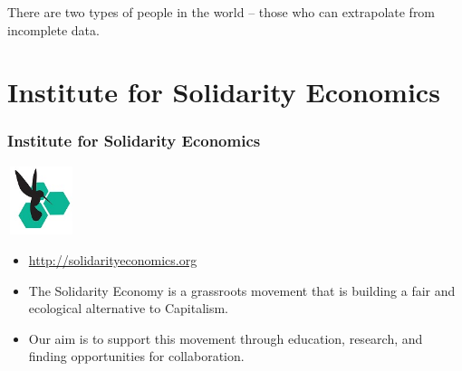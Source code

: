 \geek There are two types of people in the world -- those who can extrapolate from incomplete data.



\frame{\titlepage}

\frame{\tableofcontents}

\section{Institute for Solidarity Economics}
\frame
{
  \frametitle{Institute for Solidarity Economics}
  \begin{center}
    \includegraphics[height=2cm,width=2cm]{ise-logo.jpg}
  \end{center}
  \begin{itemize}
    \item<1-> \url{http://solidarityeconomics.org}
    \item<1-> The Solidarity Economy is a grassroots movement that is building a fair and ecological alternative to Capitalism.
    \item<1-> Our aim is to support this movement through education, research, and finding opportunities for collaboration.
  \end{itemize}
}
